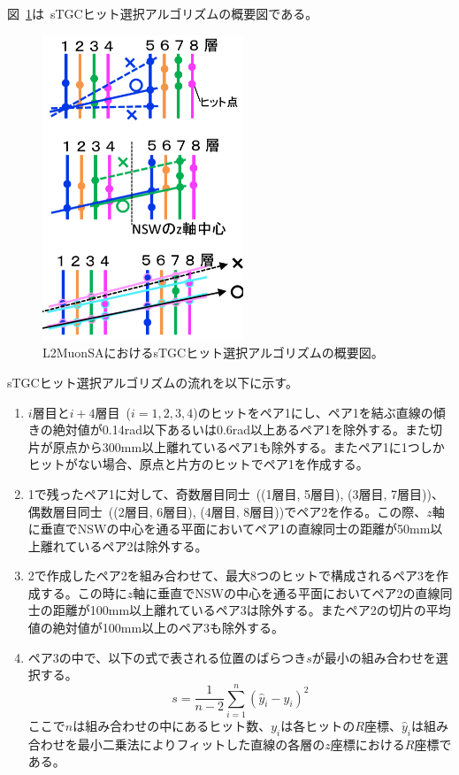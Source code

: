 図~\ref{fig:5-1}は~sTGCヒット選択アルゴリズムの概要図である。

\begin{figure}[h]
  \centering
  \includegraphics[clip, width=6cm]{fig/5/sTGC_hitSelectAlg.png}
  \caption{L2MuonSAにおけるsTGCヒット選択アルゴリズムの概要図\cite{article:kumaokaJPS}。}
  \label{fig:5-1}
\end{figure}

sTGCヒット選択アルゴリズムの流れを以下に示す。
\begin{enumerate}
    \item $i$層目と$i+4$層目~($i=1, 2, 3, 4$)のヒットをペア1にし、ペア1を結ぶ直線の傾きの絶対値が0.14rad以下あるいは0.6rad以上あるペア1を除外する。また切片が原点から300mm以上離れているペア1も除外する。またペア1に1つしかヒットがない場合、原点と片方のヒットでペア1を作成する。
    \item 1で残ったペア1に対して、奇数層目同士~((1層目, 5層目), (3層目, 7層目))、偶数層目同士~((2層目, 6層目), (4層目, 8層目))でペア2を作る。この際、$z$軸に垂直でNSWの中心を通る平面においてペア1の直線同士の距離が50mm以上離れているペア2は除外する。
    \item 2で作成したペア2を組み合わせて、最大8つのヒットで構成されるペア3を作成する。この時に$z$軸に垂直でNSWの中心を通る平面においてペア2の直線同士の距離が100mm以上離れているペア3は除外する。またペア2の切片の平均値の絶対値が100mm以上のペア3も除外する。
    \item ペア3の中で、以下の式で表される位置のばらつき$s$が最小の組み合わせを選択する。
    \begin{equation}
        s=\frac{1}{n-2} \sum_{i=1}^n\left(\hat{y}_i-y_i\right)^2\label{equ5-1}
    \end{equation}
    ここで$n$は組み合わせの中にあるヒット数、$y_i$は各ヒットの$R$座標、$\hat{y}_i$は組み合わせを最小二乗法によりフィットした直線の各層の$z$座標における$R$座標である。
\end{enumerate}

